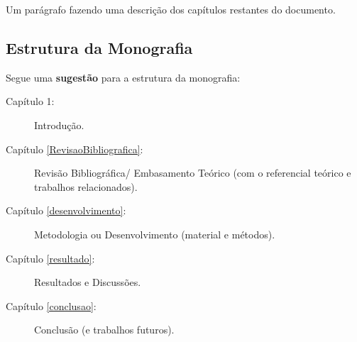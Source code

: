 Um parágrafo fazendo uma descrição dos capítulos restantes do documento. 

\subsection{Estrutura da Monografia}

Segue uma \textbf{sugestão} para a estrutura da monografia: 

\begin{description}
   \item[Capítulo 1:] Introdução.
   \item[Capítulo \ref{RevisaoBibliografica}:] Revisão Bibliográfica/ Embasamento Teórico (com o referencial teórico e trabalhos relacionados).
   \item[Capítulo \ref{desenvolvimento}:] Metodologia ou Desenvolvimento (material e métodos).
   \item[Capítulo \ref{resultado}:] Resultados e Discussões.
   \item[Capítulo \ref{conclusao}:] Conclusão (e trabalhos futuros).
\end{description}


 









